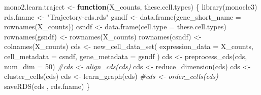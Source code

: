 \documentclass[
  openany]{book}
\newenvironment{Shaded}{\begin{snugshade}}{\end{snugshade}}
\newcommand{\AttributeTok}[1]{\textcolor[rgb]{0.77,0.63,0.00}{#1}}
\newcommand{\CommentTok}[1]{\textcolor[rgb]{0.56,0.35,0.01}{\textit{#1}}}
\newcommand{\ControlFlowTok}[1]{\textcolor[rgb]{0.13,0.29,0.53}{\textbf{#1}}}
\newcommand{\DecValTok}[1]{\textcolor[rgb]{0.00,0.00,0.81}{#1}}
\newcommand{\FunctionTok}[1]{\textcolor[rgb]{0.00,0.00,0.00}{#1}}
\newcommand{\NormalTok}[1]{#1}
\newcommand{\OtherTok}[1]{\textcolor[rgb]{0.56,0.35,0.01}{#1}}
\newcommand{\SpecialCharTok}[1]{\textcolor[rgb]{0.00,0.00,0.00}{#1}}
\newcommand{\StringTok}[1]{\textcolor[rgb]{0.31,0.60,0.02}{#1}}
\begin{document}
\begin{Shaded}
\begin{Highlighting}[]
\NormalTok{mono2.learn.traject }\OtherTok{\textless{}{-}}
  \ControlFlowTok{function}\NormalTok{(X\_counts,}
\NormalTok{           these.cell.types) \{}
    \FunctionTok{library}\NormalTok{(monocle3)}
\NormalTok{    rds.fname }\OtherTok{\textless{}{-}} \StringTok{"Trajectory{-}cds.rds"}
\NormalTok{    gsndf }\OtherTok{\textless{}{-}} \FunctionTok{data.frame}\NormalTok{(}\AttributeTok{gene\_short\_name =} \FunctionTok{rownames}\NormalTok{(X\_counts))}
\NormalTok{    csndf }\OtherTok{\textless{}{-}} \FunctionTok{data.frame}\NormalTok{(}\AttributeTok{cell.type =}\NormalTok{ these.cell.types)}
    \FunctionTok{rownames}\NormalTok{(gsndf) }\OtherTok{\textless{}{-}} \FunctionTok{rownames}\NormalTok{(X\_counts)}
    \FunctionTok{rownames}\NormalTok{(csndf) }\OtherTok{\textless{}{-}} \FunctionTok{colnames}\NormalTok{(X\_counts)}
\NormalTok{    cds }\OtherTok{\textless{}{-}} \FunctionTok{new\_cell\_data\_set}\NormalTok{(}
      \AttributeTok{expression\_data =}\NormalTok{ X\_counts,}
      \AttributeTok{cell\_metadata =}\NormalTok{ csndf,}
      \AttributeTok{gene\_metadata =}\NormalTok{ gsndf}
\NormalTok{    )}
\NormalTok{    cds }\OtherTok{\textless{}{-}} \FunctionTok{preprocess\_cds}\NormalTok{(cds, }\AttributeTok{num\_dim =} \DecValTok{50}\NormalTok{)}
    \CommentTok{\#cds \textless{}{-} align\_cds(cds)}
\NormalTok{    cds }\OtherTok{\textless{}{-}} \FunctionTok{reduce\_dimension}\NormalTok{(cds)}
\NormalTok{    cds }\OtherTok{\textless{}{-}} \FunctionTok{cluster\_cells}\NormalTok{(cds)}
\NormalTok{    cds }\OtherTok{\textless{}{-}} \FunctionTok{learn\_graph}\NormalTok{(cds)}
    \CommentTok{\#cds \textless{}{-} order\_cells(cds)}
    \FunctionTok{saveRDS}\NormalTok{(cds , rds.fname)}
\NormalTok{  \}}
\end{Highlighting}
\end{Shaded}

\begin{Shaded}
\end{Shaded}
\end{document}
